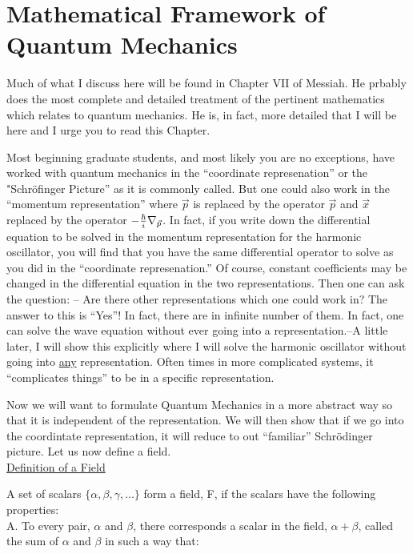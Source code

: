\section{Mathematical Framework of Quantum Mechanics}

Much of what I discuss here will be found in Chapter VII of Messiah. He prbably does the most
complete and detailed treatment of the pertinent mathematics which relates to quantum 
mechanics. He is, in fact, more detailed that I will be here and I urge you to read this
Chapter.

Most beginning graduate students, and most likely you are no exceptions, have worked with
quantum mechanics in the ``coordinate represenation'' or the "Schr\"ofinger Picture'' as it is commonly called. But one could also work in the ``momentum representation'' where $\vec{p}$ is replaced by the operator $\vec p$ and $\vec x$ replaced by the operator 
$-{\hbar\over i}\nabla_{\vec p}$. In fact, if you write down the differential equation to be 
solved in the momentum representation for the harmonic oscillator, you will find that you have the same differential operator to solve as you did in the ``coordinate represenation.'' Of course, constant coefficients may be changed in the differential equation in the two representations. Then one can ask the question: -- Are there other representations which one could work in? The answer to this is ``Yes''! In fact, there are in infinite number of them. 
In fact, one can solve the wave equation without ever going into a representation.--A little later, I will show this explicitly where I will solve the harmonic oscillator without going into \underline{any} representation. Often times in more complicated systems, it ``complicates things'' to be in a specific representation.

Now we will want to formulate Quantum Mechanics in a more abstract way so that it is independent of the representation. 
We will then show that if we go into the coordintate representation, it will reduce to out ``familiar'' 
Schr\"odinger picture.  Let us now define a field.\\

\underline{Definition of a Field}

A set of scalars $\{\alpha,\beta,\gamma,...\}$ form a field, F, if the scalars have the following properties:\\

A. To every pair, $\alpha$ and $\beta$, there corresponds a scalar in the field, $\alpha + \beta$, called the sum of $\alpha$ and $\beta$ in such a way that:

